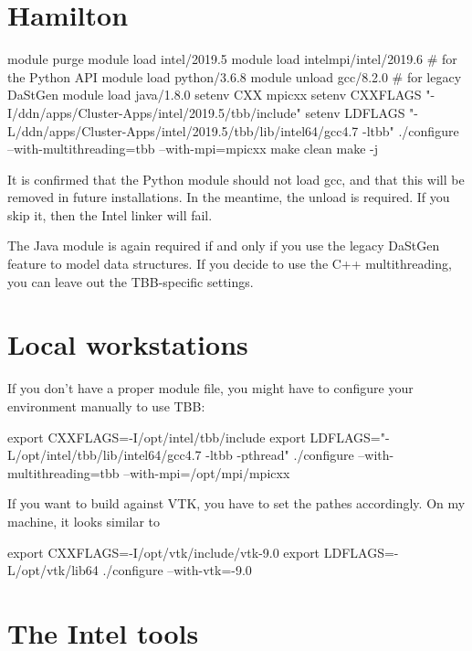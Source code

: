 \section{Hamilton}


\begin{code}
 module purge
 module load intel/2019.5
 module load intelmpi/intel/2019.6
 # for the Python API
 module load python/3.6.8 
 module unload gcc/8.2.0
 # for legacy DaStGen
 module load java/1.8.0
 setenv CXX mpicxx
 setenv CXXFLAGS "-I/ddn/apps/Cluster-Apps/intel/2019.5/tbb/include"
 setenv LDFLAGS "-L/ddn/apps/Cluster-Apps/intel/2019.5/tbb/lib/intel64/gcc4.7 -ltbb"
 ./configure --with-multithreading=tbb --with-mpi=mpicxx
 make clean
 make -j
\end{code}


\begin{remark}
 It is confirmed that the Python module should not load gcc, and that this will
 be removed in future installations.
 In the meantime, the unload is required.
 If you skip it, then the Intel linker will fail.
\end{remark}

\noindent
The Java module is again required if and only if you use the legacy DaStGen
feature to model data structures.
If you decide to use the C++ multithreading, you can leave out the TBB-specific
settings.


\section{Local workstations}


If you don't have a proper module file, you might have to configure your environment manually to use TBB:
\begin{code}
 export CXXFLAGS=-I/opt/intel/tbb/include
 export LDFLAGS="-L/opt/intel/tbb/lib/intel64/gcc4.7 -ltbb -pthread"
 ./configure --with-multithreading=tbb --with-mpi=/opt/mpi/mpicxx
\end{code}


If you want to build against VTK, you have to set the pathes accordingly. 
On my machine, it looks similar to
\begin{code}
 export CXXFLAGS=-I/opt/vtk/include/vtk-9.0
 export LDFLAGS=-L/opt/vtk/lib64
 ./configure --with-vtk=-9.0
\end{code}



\section{The Intel tools}
\label{section:supercomputers:IntelTools}

